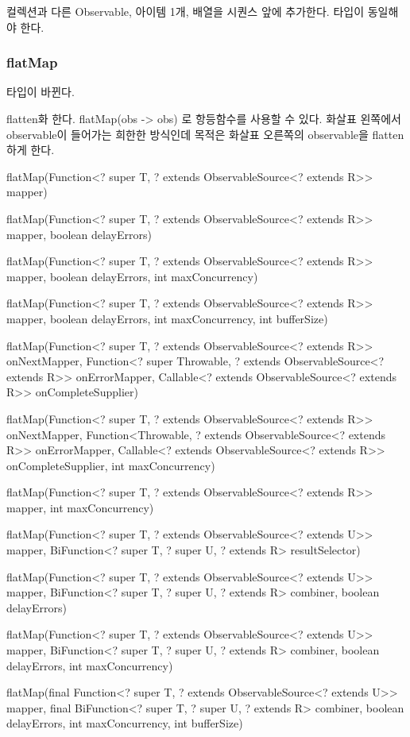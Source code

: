 \documentclass{book}
\begin{document}
{컬렉션과 다른 Observable, 아이템 1개, 배열을 시퀀스 앞에 추가한다.
타입이 동일해야 한다.

\subsubsection{flatMap}
타입이 바뀐다.

flatten화 한다. 
flatMap(obs -> obs) 로 항등함수를 사용할 수 있다.
화살표 왼쪽에서 observable이 들어가는 희한한 방식인데 목적은 화살표 오른쪽의 observable을 flatten하게 한다.

flatMap(Function<? super T, ? extends ObservableSource<? extends R>> mapper)

flatMap(Function<? super T, ? extends ObservableSource<? extends R>> mapper, boolean delayErrors)

flatMap(Function<? super T, ? extends ObservableSource<? extends R>> mapper, boolean delayErrors, int maxConcurrency)

flatMap(Function<? super T, ? extends ObservableSource<? extends R>> mapper,
            boolean delayErrors, int maxConcurrency, int bufferSize)

flatMap(Function<? super T, ? extends ObservableSource<? extends R>> onNextMapper,
            Function<? super Throwable, ? extends ObservableSource<? extends R>> onErrorMapper,
            Callable<? extends ObservableSource<? extends R>> onCompleteSupplier)

flatMap(Function<? super T, ? extends ObservableSource<? extends R>> onNextMapper,
            Function<Throwable, ? extends ObservableSource<? extends R>> onErrorMapper,
            Callable<? extends ObservableSource<? extends R>> onCompleteSupplier,
            int maxConcurrency)
            
flatMap(Function<? super T, ? extends ObservableSource<? extends R>> mapper, int maxConcurrency)


flatMap(Function<? super T, ? extends ObservableSource<? extends U>> mapper,
            BiFunction<? super T, ? super U, ? extends R> resultSelector)

flatMap(Function<? super T, ? extends ObservableSource<? extends U>> mapper,
            BiFunction<? super T, ? super U, ? extends R> combiner, boolean delayErrors)

flatMap(Function<? super T, ? extends ObservableSource<? extends U>> mapper,
            BiFunction<? super T, ? super U, ? extends R> combiner, boolean delayErrors, int maxConcurrency)


flatMap(final Function<? super T, ? extends ObservableSource<? extends U>> mapper,
            final BiFunction<? super T, ? super U, ? extends R> combiner, boolean delayErrors, int maxConcurrency, int bufferSize)


}
\end{document}
